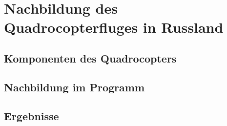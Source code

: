 \chapter{Nachbildung des Quadrocopterfluges in Russland}
\label{chap:nachbildung_des_quadrocopter}

\section{Komponenten des Quadrocopters}
\label{sec:komponenten}

\section{Nachbildung im Programm}
\label{sec:nachbildung_im_programm}

\section{Ergebnisse}
\label{sec:ergebnisse_quadrocopter}
